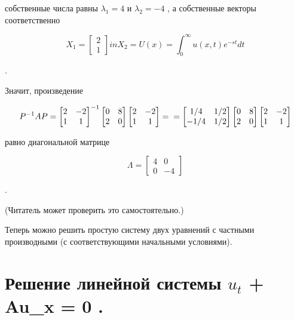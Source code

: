 \documentclass[
  ukrainian,
]{article}
\begin{document}
собственные числа равны \(\lambda_ 1 = 4\) и \(\lambda_2 = -4\) , а
собственные векторы соответственно

\[
X_1 =
\begin{bmatrix} 2 \\ 1 \end{bmatrix}
in  X_2 =
U(x) = \int_{0}^{\infty} u(x, t) e^{-st} dt
\]

.

Значит, произведение

\[
P^{-1}AP =
\begin{bmatrix} 2 & -2 \\ 1 & 1 \end{bmatrix}
^{-1}
\begin{bmatrix} 0 & 8 \\ 2 & 0 \end{bmatrix}
\begin{bmatrix} 2 & -2 \\ 1 & 1 \end{bmatrix}
= \\ =
\begin{bmatrix} 1/4 & 1/2 \\ -1/4 & 1/2 \end{bmatrix}
\begin{bmatrix} 0 & 8 \\ 2 & 0 \end{bmatrix}
\begin{bmatrix} 2 & -2 \\ 1 & 1 \end{bmatrix}
\]

равно диагональной матрице

\[
\Lambda =
\begin{bmatrix} 4 & 0 \\ 0 & -4 \end{bmatrix}
\]

.

(Читатель может проверить это самостоятельно.)

Теперь можно решить простую систему двух уравнений с частными
производными (с соответствующими начальными условиями).

\section{\texorpdfstring{Решение линейной системы \(u_t\) + Au\_x = 0
.}{Решение линейной системы u\_t + Au\_x = 0 .}}\label{ux440ux435ux448ux435ux43dux438ux435-ux43bux438ux43dux435ux439ux43dux43eux439-ux441ux438ux441ux442ux435ux43cux44b-u_t-au_x-0-.}
\end{document}
